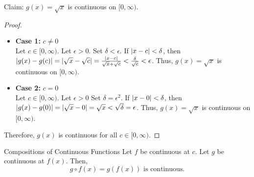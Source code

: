 

Claim: \(g(x) = \sqrt{x}\) is continuous on \([0,\infty)\).

\begin{customframedproof}[linecolor=xgray]
    \begin{proof}
        \begin{itemize}
            \item \textbf{Case 1:} \(c \ne 0\) \\

                  Let \(c \in [0,\infty)\). Let \(\epsilon > 0\). Set \(\delta < \epsilon\). If \(\left|x - c\right| < \delta\), then \(\left|g(x) - g(c)\right| = \left|\sqrt{x} - \sqrt{c}\right| = \frac{\left|x - c\right|}{\sqrt{x} + \sqrt{c}} < \frac{\delta}{\sqrt{c}} < \epsilon\). Thus, \(g(x) = \sqrt{x}\) is continuous on \([0,\infty)\).

            \item \textbf{Case 2:} \(c = 0\) \\

                  Let \(c \in [0,\infty)\). Let \(\epsilon > 0\) Set \(\delta = \epsilon^2\). If \(\left|x - 0\right| < \delta\), then \(\left|g(x) - g(0)\right| = \left|\sqrt{x} - 0\right| = \sqrt{x} < \sqrt{\delta} = \epsilon\). Thus, \(g(x) = \sqrt{x}\) is continuous on \([0,\infty)\).
        \end{itemize}
        Therefore, \(g(x)\) is continuous for all \(c \in [0,\infty)\).\qedhere
    \end{proof}
\end{customframedproof}

\begin{ntheorem}
    {Compositions of Continuous Functions} Let \(f\) be continuous at \(c\). Let \(g\) be continuous at \(f(x)\). Then,
    \[
        g \circ f(x) = g(f(x)) \text{ is continuous.}
    \]
\end{ntheorem}


